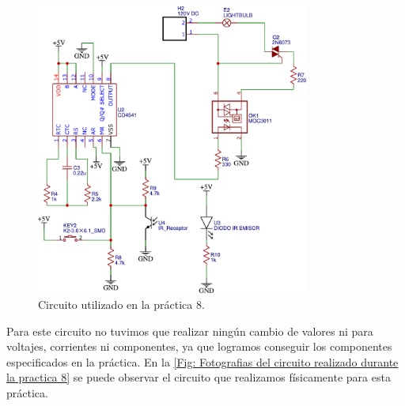 \begin{figure}[htb]
    \centering
    \includegraphics[width=0.8\textwidth]{media/circuito_08}
    \caption{Circuito utilizado en la práctica 8.}
    \label{Fig: Circuito utilizado en la practica 8}
\end{figure}

Para este circuito no tuvimos que realizar ningún cambio de valores ni para voltajes, corrientes ni componentes, ya que logramos conseguir los componentes especificados en la práctica. En la \cref{Fig: Fotografias del circuito realizado durante la practica 8} se puede observar el circuito que realizamos físicamente para esta práctica.

